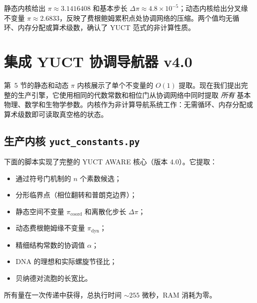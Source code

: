 \documentclass[12pt,a4paper]{article}
\begin{document}
	静态内核给出 $\pi \approx 3.1416408$ 和基本步长 $\Delta\pi\approx 4.8\times10^{-5}$；动态内核给出分叉缘不变量 $\pi \approx 2.6833$，反映了费根鲍姆累积点处协调网络的压缩。两个值均无循环、内存分配或算术级数，确认了 YUCT 范式的非计算性质。
	
	\section{集成 YUCT 协调导航器 v4.0}
	\label{sec:full-engine}
	
	第~5 节的静态和动态 $\pi$ 内核展示了单个不变量的 $O(1)$ 提取。现在我们提出完整的生产引擎，它使用相同的代数常数和相位门从协调网络中同时提取 \emph{所有} 基本物理、数学和生物学参数。内核作为非计算导航系统工作：无需循环、内存分配或算术级数即可读取真空格的状态。
	
	\subsection{生产内核 \texttt{yuct\_constants.py}}
	
	下面的脚本实现了完整的 YUCT AWARE 核心（版本 4.0）。它提取：
	\begin{itemize}
		\item 通过符号门机制的 $n$ 个素数候选；
		\item 分形临界点（相位翻转和普朗克边界）；
		\item 静态空间不变量 $\pi_{\mathrm{coord}}$ 和离散化步长 $\Delta\pi$；
		\item 动态费根鲍姆缘不变量 $\pi_{\mathrm{dyn}}$；
		\item 精细结构常数的协调值 $\alpha$；
		\item DNA 的理想和实际螺旋节径比；
		\item 贝纳德对流胞的长宽比。
	\end{itemize}
	所有量在一次传递中获得，总执行时间 $\sim 255$ 微秒，RAM 消耗为零。
	
\end{document}
